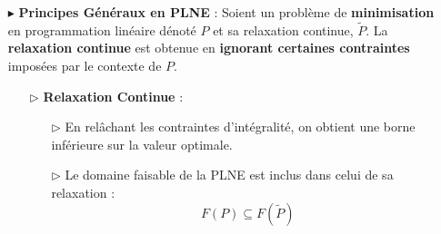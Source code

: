 \documentclass{report}
\begin{document}
\begin{multicols*}{2}
\begin{itemize}
        \begin{center}
            
        \end{center}

    \item[$\blacktriangleright$] \textbf{Principes Généraux en PLNE} :
        Soient un problème de \textbf{minimisation} en 
        programmation linéaire dénoté $P$ et sa relaxation continue, 
        $\tilde{P}$. La \textbf{relaxation continue} est obtenue en 
        \textbf{ignorant certaines contraintes}  imposées par 
        le contexte de $P$. 

    \begin{enumerate}
        \item[$\rhd$] \textbf{Relaxation Continue} :
        \begin{itemize}
            \item[$\rhd$] En relâchant les contraintes d'intégralité, on obtient une borne inférieure sur la valeur optimale.
            \item[$\rhd$] Le domaine faisable de la PLNE est inclus dans celui de sa relaxation :
            \[
            F(P) \subseteq F(\tilde{P})
            \]
\end{itemize}
\end{enumerate}
\end{itemize}
\end{multicols*}
\end{document}
